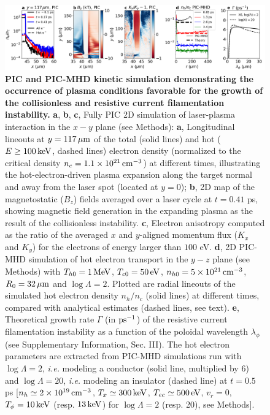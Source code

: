 \documentclass[aps,twocolumn,showpacs,superscriptaddress]{revtex4}
\begin{document}
\begin{figure}[tbh!]
\includegraphics[scale=0.42]{Figure_3_new2.png}
\caption{
\textbf{PIC and PIC-MHD kinetic simulation demonstrating the occurrence of plasma conditions favorable for the growth of the collisionless  and resistive current filamentation  instability.}
\textbf{a}, \textbf{b}, \textbf{c}, Fully PIC 2D simulation of laser-plasma interaction in the $x-y$ plane (see Methods): 
\textbf{a}, Longitudinal lineouts at $y=117\,\rm \mu m$ of the total (solid lines) and hot ($E \ge 100\,\rm keV$, dashed lines) electron density (normalized to the critical density $n_c =1.1\times 10^{21}\,\rm cm^{-3}$) at different times, illustrating the hot-electron-driven plasma expansion along the target normal and away from the laser spot (located at $y=0$);
\textbf{b}, 2D map of the magnetostatic ($B_z$) fields  averaged over a laser cycle at
$t =0.41$ ps, showing magnetic field generation in the expanding plasma as the result of the collisionless instability.
\textbf{c}, Electron anisotropy computed as the ratio of the averaged $x$ and $y$-aligned momentum flux ($K_x$ and $K_y$) for the electrons  of energy larger than $100$ eV.
\textbf{d}, 2D PIC-MHD simulation of hot electron transport in the $y-z$ plane (see Methods) with $T_{h0} = 1\,\rm MeV$, $T_{c0} = 50\,\rm eV$, $n_{h0} = 5 \times 10^{21}\,\rm cm^{-3}$, $R_0 = 32\,\rm \mu m$ and $\log \Lambda =2$. Plotted are radial lineouts of the simulated hot electron density $n_h/n_c$ (solid lines) at different times, compared with analytical estimates (dashed lines, see text).
\textbf{e}, Theoretical growth rate $\Gamma$ (in $\rm ps^{-1}$) of the resistive current filamentation instability as a function of the poloidal wavelength $\lambda_\phi$ (see Supplementary Information, Sec. III). The hot electron parameters are extracted from PIC-MHD simulations run with $\log \Lambda = 2$, \emph{i.e.} modeling a conductor (solid line, multiplied by 6) and $\log \Lambda = 20$, \emph{i.e.} modeling an insulator (dashed line) at $t=0.5$ ps [$n_h \simeq 2\times 10^{19}\,\rm cm^{-3}$, $T_x \simeq 300\,\rm keV$, $T_{ec} \simeq 500\,\rm eV$, $v_r=0$,  $T_\phi = 10\,\rm keV$ (resp. $13\,\rm keV$) for $\log \Lambda =2$ (resp. 20), see Methods].}
\label{fig:pic}
\end{figure}
\end{document}
